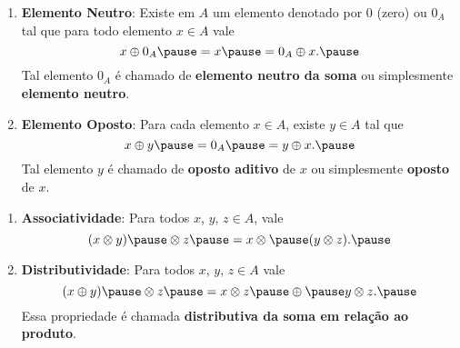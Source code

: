 \documentclass{beamer}
\begin{document}
    \begin{frame}
        \begin{definicao}
            \begin{enumerate}[label={\roman*})]
                \conti

                \item \textbf{Elemento Neutro}: \pause Existe em $A$ \pause um elemento denotado por $0$ \pause (zero) ou $0_{A}$ \pause tal que para todo elemento $x \in A$ \pause vale\pause
                \[
                    x \oplus 0_A \pause = x \pause = 0_A \oplus x.\pause
                \]
                Tal elemento $0_A$ \pause \'e chamado de \textbf{elemento neutro da soma} \pause ou simplesmente \textbf{elemento neutro}.\pause

                \vspace{.7cm}

                \item \textbf{Elemento Oposto}: \pause Para cada elemento $x \in A$, \pause existe $y \in A$ \pause tal que\pause
                \[
                    x \oplus y \pause = 0_A \pause = y \oplus x.\pause
                \]
                Tal elemento $y$ \pause \'e chamado de \textbf{oposto aditivo} \pause de $x$ \pause ou simplesmente \textbf{oposto} de $x$.\pause

                \vspace{.7cm}

                \seti
    \end{enumerate}
        \end{definicao}
    \end{frame}

    \begin{frame}
        \begin{definicao}
            \begin{enumerate}[label={\roman*})]
                \conti

                \item \textbf{Associatividade}: \pause Para todos $x$, \pause $y$, \pause $z \in A$, \pause vale\pause
                \[
                    (x\otimes y) \pause \otimes z \pause = x \otimes \pause (y\otimes z).\pause
                \]

                \vspace{.7cm}

                \item \textbf{Distributividade}: \pause Para todos $x$, \pause $y$, \pause $z \in A$ \pause vale\pause
                \[
                    (x \oplus y) \pause \otimes z \pause = x \otimes z \pause \oplus \pause y\otimes z.\pause
                \]
                Essa propriedade {\'e} chamada \textbf{distributiva da soma em rela{\c c}{\~a}o ao produto}.\pause

                \vspace{.7cm}

                \seti
            \end{enumerate}
        \end{definicao}
    \end{frame}
\end{document}
